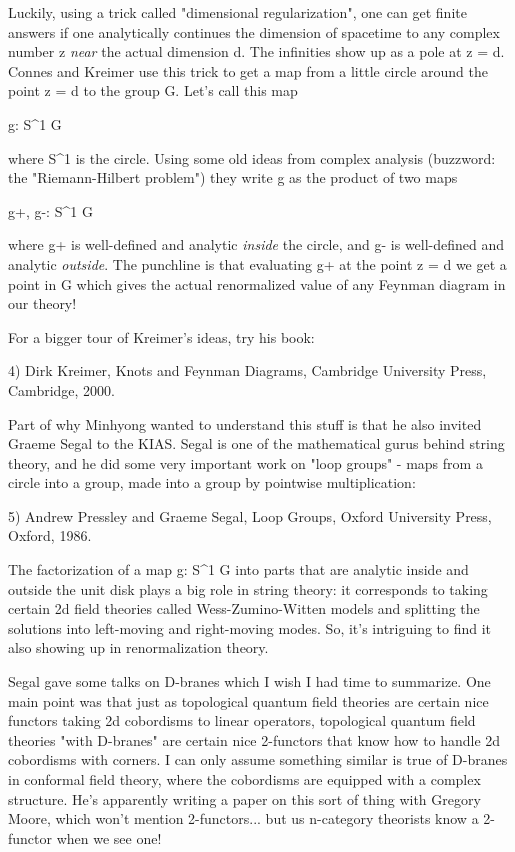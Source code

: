 Luckily, using a trick called "dimensional regularization", one can get 
finite answers if one analytically continues the dimension of spacetime to 
any complex number z \emph{near} the actual dimension d.  The infinities show up 
as a pole at z = d.  Connes and Kreimer use this trick to get a map from a 
little circle around the point z = d to the group G.  Let's call this map

g: S^{1} \to  G

where S^{1} is the circle.  Using some old ideas from complex analysis 
(buzzword: the "Riemann-Hilbert problem") they write g as the product
of two maps 

g+, g-: S^{1} \to  G

where g+ is well-defined and analytic \emph{inside} the circle, and g- is 
well-defined and analytic \emph{outside}.  The punchline is that evaluating 
g+ at the point z = d we get a point in G which gives the actual 
renormalized value of any Feynman diagram in our theory!  

For a bigger tour of Kreimer's ideas, try his book:

4) Dirk Kreimer, Knots and Feynman Diagrams, Cambridge University Press,
Cambridge, 2000.

Part of why Minhyong wanted to understand this stuff is that he
also invited Graeme Segal to the KIAS.  Segal is one of the
mathematical gurus behind string theory, and he did some very
important work on "loop groups" - maps from a circle into a group, 
made into a group by pointwise multiplication:

5) Andrew Pressley and Graeme Segal, Loop Groups, Oxford University
Press, Oxford, 1986. 
 
The factorization of a map g: S^{1} \to  G into parts that are analytic
inside and outside the unit disk plays a big role in string theory: 
it corresponds to taking certain 2d field theories called Wess-Zumino-Witten 
models and splitting the solutions into left-moving and right-moving modes.  
So, it's intriguing to find it also showing up in renormalization theory.

Segal gave some talks on D-branes which I wish I had time to summarize.
One main point was that just as topological quantum field theories 
are certain nice functors taking 2d cobordisms to linear operators, 
topological quantum field theories "with D-branes" are certain nice 
2-functors that know how to handle 2d cobordisms with corners.  I can 
only assume something similar is true of D-branes in conformal field 
theory, where the cobordisms are equipped with a complex structure.
He's apparently writing a paper on this sort of thing with Gregory Moore, 
which won't mention 2-functors... but us n-category theorists know a
2-functor when we see one!

